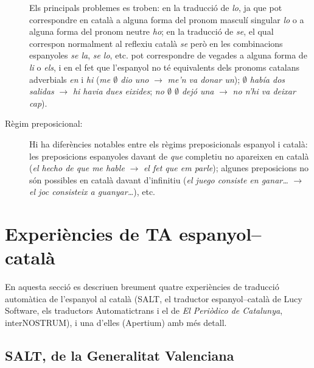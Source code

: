 \begin{description}
Els principals problemes es troben: en la traducció de \emph{lo}, ja que
pot correspondre 
en català a alguna forma del pronom masculí singular {\em
  lo} o a alguna forma del
pronom neutre \emph{ho}; en la traducció de 
\emph{se}, el qual correspon normalment al reflexiu 
català \emph{se} però
en les combinacions espanyoles \emph{se la}, \emph{se lo}, etc. pot
correspondre de vegades a alguna forma de \emph{li} o \emph{els}, i en
el fet que l'espanyol no té equivalents dels pronoms catalans
adverbials \emph{en} i \emph{hi}  (\emph{me $\emptyset$ dio uno}
$\rightarrow$
\emph{me'n va donar un}); \emph{$\emptyset$ había dos salidas}
$\rightarrow$ \emph{hi havia dues eixides}; \emph{no $\emptyset$
  $\emptyset$ dejó una} $\rightarrow$ \emph{no n'hi va deixar cap}).
\item[Règim preposicional:] Hi ha diferències notables entre
  els règims preposicionals espanyol i català: les
  preposicions espanyoles davant de \emph{que} completiu no apareixen
  en català (\emph{el hecho de que me hable} $\rightarrow$ \emph{el
    fet que em parle}); algunes preposicions no són possibles en català
  davant d'infinitiu (\emph{el juego consiste en ganar\ldots }
  $\rightarrow$ \emph{el joc consisteix a guanyar\ldots}), etc.
\end{description}

\section{Experiències de TA espanyol--català}
\label{se:ETACC}

En aquesta secció es descriuen breument quatre experiències de
traducció automàtica de l'espanyol al català (SALT, el traductor
espanyol--català de Lucy Software, els traductors Automatictrans i el
de \textit{El Periòdico de Catalunya}, interNOSTRUM), i una d'elles
(Apertium) amb més detall.

\subsection{SALT, de la Generalitat Valenciana}


